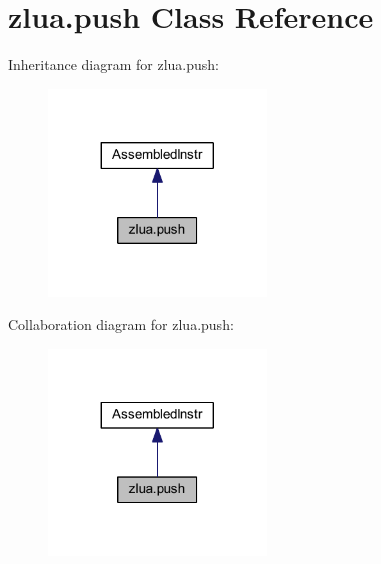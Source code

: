 \hypertarget{classzlua_1_1push}{}\section{zlua.\+push Class Reference}
\label{classzlua_1_1push}


Inheritance diagram for zlua.\+push\+:
\nopagebreak
\begin{figure}[H]
\begin{center}
\leavevmode
\includegraphics[width=164pt]{classzlua_1_1push__inherit__graph}
\end{center}
\end{figure}


Collaboration diagram for zlua.\+push\+:
\nopagebreak
\begin{figure}[H]
\begin{center}
\leavevmode
\includegraphics[width=164pt]{classzlua_1_1push__coll__graph}
\end{center}
\end{figure}
